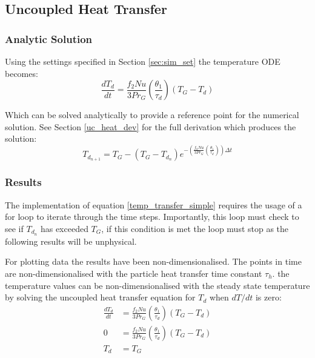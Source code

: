 \documentclass[../Interim_Report_Master]{subfiles}
\begin{document}
\subsection{Uncoupled Heat Transfer}
\subsubsection{Analytic Solution}
Using the settings specified in Section \ref{sec:sim_set} the temperature ODE becomes:
\begin{equation}
\frac{dT_{d}}{dt} = \frac{f_{2}Nu}{3Pr_{G}}\left(\frac{\theta_1}{\tau_d}\right)(T_{G}-T_{d})
\label{temp_transfer_simple}
\end{equation}

Which can be solved analytically to provide a reference point for the numerical solution. See Section \ref{uc_heat_dev} for the full derivation which produces the solution:
\begin{equation}
T_{d_{n+1}} = T_G - (T_G-T_{d_{n}})e^{-\left(\frac{f_{2}Nu}{3Pr_{G}}\left(\frac{\theta_1}{\tau_d}\right)\right)\Delta t}
\label{heat_sol_an}
\end{equation}

\subsubsection{Results}
The implementation of equation \ref{temp_transfer_simple} requires the usage of a for loop to iterate through the time steps. Importantly, this loop must check to see if $T_{d_{n}}$ has exceeded $T_G$, if this condition is met the loop must stop as the following results will be unphysical. 

For plotting data the results have been non-dimensionalised. The points in time are non-dimensionalised with the particle heat transfer time constant $\tau_h$. the temperature values can be non-dimensionalised with the steady state temperature by solving the uncoupled heat transfer equation for $T_d$ when $dT/dt$ is zero:
\begin{subequations}
\begin{align}
\frac{dT_{d}}{dt} &= \frac{f_{2}Nu}{3Pr_{G}}\left(\frac{\theta_1}{\tau_d}\right)(T_{G}-T_{d}) \\
0 &= \frac{f_{2}Nu}{3Pr_{G}}\left(\frac{\theta_1}{\tau_d}\right)(T_{G}-T_{d}) \\
T_d &= T_G
\end{align}
\end{subequations}
\end{document}
